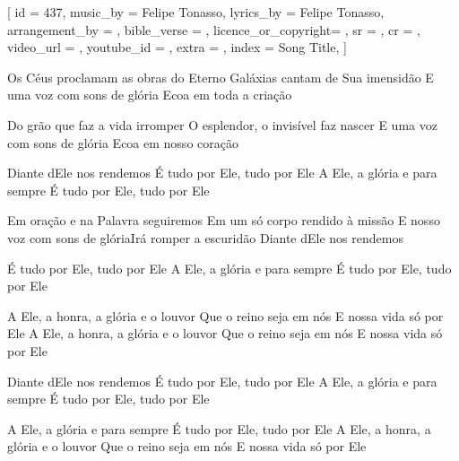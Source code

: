 [
    id                  = {437},
    music_by            = {Felipe Tonasso}, %
    lyrics_by           = {Felipe Tonasso}, %
    arrangement_by      = {}, %
    bible_verse         = {},
    licence_or_copyright= {},
    sr                  = {},
    cr                  = {},
    video_url           = {}, %
    youtube_id          = {}, %
    extra               = {},
    index               = {Song Title},
]

\beginverse
Os Céus proclamam as obras do Eterno
Galáxias cantam de Sua imensidão
E uma voz com sons de glória
Ecoa em toda a criação

Do grão que faz a vida irromper
O esplendor, o invisível faz nascer
E uma voz com sons de glória
Ecoa em nosso coração

Diante dEle nos rendemos
É tudo por Ele, tudo por Ele
A Ele, a glória e para sempre
É tudo por Ele, tudo por Ele

Em oração e na Palavra seguiremos
Em um só corpo rendido à missão
E nosso voz com sons de glóriaIrá romper a escuridão
Diante dEle nos rendemos

É tudo por Ele, tudo por Ele
A Ele, a glória e para sempre
É tudo por Ele, tudo por Ele

A Ele, a honra, a glória e o louvor
Que o reino seja em nós
E nossa vida só por Ele
A Ele, a honra, a glória e o louvor
Que o reino seja em nós
E nossa vida só por Ele

Diante dEle nos rendemos
É tudo por Ele, tudo por Ele
A Ele, a glória e para sempre
É tudo por Ele, tudo por Ele

A Ele, a glória e para sempre
É tudo por Ele, tudo por Ele
A Ele, a honra, a glória e o louvor
Que o reino seja em nós
E nossa vida só por Ele
\endverse

\beginchorus

\endchorus

\endsong
